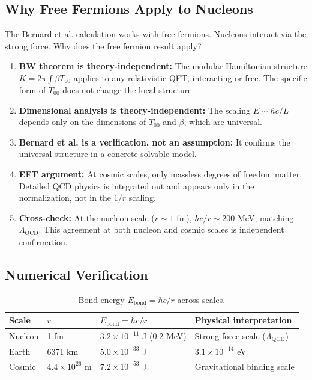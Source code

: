 \documentclass[11pt,letterpaper]{article}
\begin{document}
\subsection{Why Free Fermions Apply to Nucleons}

The Bernard et al. calculation works with free fermions. Nucleons interact via
the strong force. Why does the free fermion result apply?

\begin{enumerate}
  \item \textbf{BW theorem is theory-independent:} The modular Hamiltonian structure
    $K = 2\pi \int \beta T_{00}$ applies to any relativistic QFT, interacting
    or free. The specific form of $T_{00}$ does not change the local structure.

  \item \textbf{Dimensional analysis is theory-independent:} The scaling
    $E \sim \hbar c/L$ depends only on the dimensions of $T_{00}$ and $\beta$,
    which are universal.

  \item \textbf{Bernard et al. is a verification, not an assumption:} It confirms
    the universal structure in a concrete solvable model.

  \item \textbf{EFT argument:} At cosmic scales, only massless degrees of freedom
    matter. Detailed QCD physics is integrated out and appears only in the
    normalization, not in the $1/r$ scaling.

  \item \textbf{Cross-check:} At the nucleon scale ($r \sim 1$ fm),
    $\hbar c/r \sim 200$ MeV, matching $\Lambda_{\mathrm{QCD}}$. This agreement at
    both nucleon and cosmic scales is independent confirmation.
\end{enumerate}

\subsection{Numerical Verification}

\begin{table}[H]
  \centering
  \caption[Bond energy across scales]{Bond energy $E_{\mathrm{bond}} = \hbar c/r$ across scales.}
  \label{tab:bond_energy}
  \begin{tabular}{llll}
    \toprule
    Scale & $r$ & $E_{\mathrm{bond}} = \hbar c/r$ & Physical interpretation \\
    \midrule
    Nucleon & 1 fm & $3.2 \times 10^{-11}$ J (0.2 MeV) & Strong force scale ($\Lambda_{\mathrm{QCD}}$) \\
    Earth & 6371 km & $5.0 \times 10^{-33}$ J & $3.1 \times 10^{-14}$ eV \\
    Cosmic & $4.4 \times 10^{26}$ m & $7.2 \times 10^{-53}$ J & Gravitational binding scale \\
    \bottomrule
  \end{tabular}
\end{table}
\end{document}
